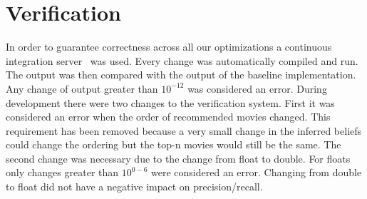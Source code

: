 \section{Verification}\label{sec:verification}
In order to guarantee correctness across all our optimizations a continuous integration server~\cite{jenkins} was used. Every change was automatically compiled and run. The output was then compared with the output of the baseline implementation. Any change of output greater than $10^{-12}$ was considered an error. During development there were two changes to the verification system. First it was considered an error when the order of recommended movies changed. This requirement has been removed because a very small change in the inferred beliefs could change the ordering but the top-n movies would still be the same. The second change was necessary due to the change from float to double. For floats only changes greater than $10^{0-6}$ were considered an error. Changing from double to float did not have a negative impact on precision/recall.